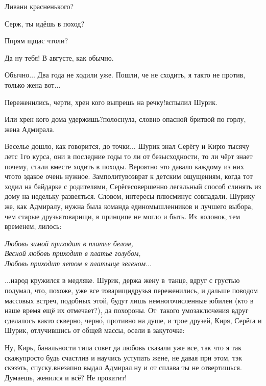 {\diagdash Ливани красненького?

\diagdash Серж, ты идёшь в поход? 

\diagdash П\sdash прям щ\sdash щас чтоли?

\diagdash Да ну тебя! В августе, как обычно.

\diagdash Обычно$\ldots$ Два года не ходили уже. Пошли, че не сходить, я так\sdash то не против, только жена вот$\ldots$

\diagdash Переженились, черти, хрен кого выпрешь на речку!\mdash вспылил Шурик.

\diagdash Или хрен кого дома удержишь?\mdash полоснула, словно опасной бритвой по горлу, жена Адмирала. 

Веселье дошло, как говорится, до точки$\ldots$ Шурик знал Серёгу и Кирю тысячу лет\mdash с 1\sdash го курса, они в последние годы то ли от безысходности, то ли чёрт знает почему, стали вместе ходить в походы. Вероятно это давало каждому из них что\sdash то эдакое очень нужное. Замполиту\mdash возврат к детским ощущениям, когда тот ходил на байдарке с родителями, Серёге\mdash совершенно легальный способ слинять из дому на недельку развеяться. Словом, интересы плюс\sdash минус совпадали. Шурику же, как Адмиралу, нужна была команда единомышленников и лучшего выбора, чем старые друзья\sdash товарищи, в принципе не могло и быть. Из~колонок, тем временем, лилось:

\vspace{0.1cm}
\noindent\textit{%
	\hspace*{1.4cm}Любовь зимой приходит в платье белом,\\
	\hspace*{1.4cm}Весной любовь приходит в платье голубом,\\
	\hspace*{1.4cm}Любовь приходит летом в платьице зеленом$\ldots$
}

$\ldots$народ кружился в медляке. Шурик, держа жену в~танце, вдруг с грустью подумал, что, похоже, уже все товарищи\sdash друзья переженились, и дальше поводом массовых встреч, подобных этой, будут лишь немногочисленные юбилеи (кто в наше время ещё их отмечает?), да похороны. От~такого умозаключения вдруг сделалось как\sdash то скверно, черн\'{о}, противно на душе, и трое друзей, Киря, Серёга и Шурик, отлучившись от общей массы, осели в закуточке:

\diagdash Ну, Кирь, банальности типа совет да любовь сказали уже все, так что я так скажу\mdash просто будь счастлив и научись уступать жене, не давая при этом, тэк скэзэть, спуску.\mdash внезапно выдал Адмирал.\mdash ну и от сплава ты не отвертишься. Думаешь, женился и всё? Не прокатит!

}
